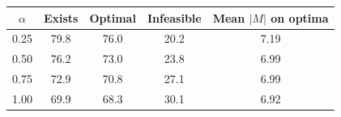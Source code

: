 \begin{tabular}{ccccc}
\toprule
$\alpha$ & Exists & Optimal & Infeasible & Mean $|M|$ on optima \\
\midrule
0.25 & 79.8 & 76.0 & 20.2 & 7.19 \\
0.50 & 76.2 & 73.0 & 23.8 & 6.99 \\
0.75 & 72.9 & 70.8 & 27.1 & 6.99 \\
1.00 & 69.9 & 68.3 & 30.1 & 6.92 \\
\bottomrule
\end{tabular}

